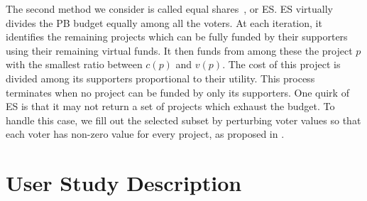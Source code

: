 \documentclass[letterpaper]{article} %
\newcommand{\kibitz}[2]{\ifnum\Comments=1{\color{#1}{#2}}\fi}
\newcommand{\rf}[1]{\kibitz{blue}{[Roy says:#1]}}
\newcommand{\kg}[1]{\kibitz{red}{[Kobi says:#1]}}
\newcommand{\gb}[1]{\kibitz{brown}{[GB:#1]}}
\newcommand{\mes}{ES}
\begin{document}
The  second method we consider is called equal shares~\citep{PS20}, %
 or \mes{}. %
\mes{} virtually  divides the PB budget equally among all the voters. 
At each iteration, it identifies the remaining projects which can be fully funded by their supporters using their remaining virtual funds.
It then funds from among these the  project $p$ with the smallest ratio between $c(p)$ and $v(p)$. 
The cost of this project is divided among its supporters proportional to their utility. %
This process terminates when no project can be funded by only its supporters. %
%
One quirk of \mes{} is that it may not return a set of projects which exhaust the budget. To handle this case, we fill out the selected subset by perturbing voter values so that each voter has non-zero value for every project, as proposed in  \citet{peters2021proportional}. 
 


\section{User Study Description}\label{sec:description}

\end{document}
